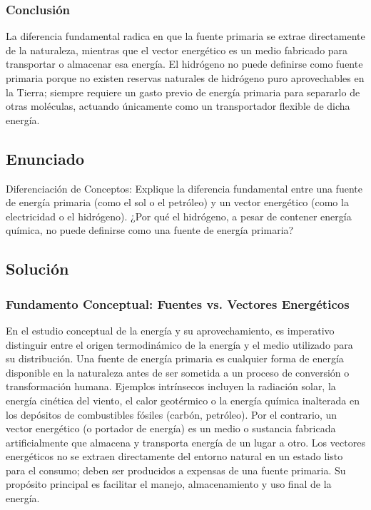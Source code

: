 \documentclass[12pt,a4paper]{article}
\begin{document}
\subsubsection*{Conclusión}
La diferencia fundamental radica en que la fuente primaria se extrae directamente de la naturaleza, mientras que el vector energético es un medio fabricado para transportar o almacenar esa energía. El hidrógeno no puede definirse como fuente primaria porque no existen reservas naturales de hidrógeno puro aprovechables en la Tierra; siempre requiere un gasto previo de energía primaria para separarlo de otras moléculas, actuando únicamente como un transportador flexible de dicha energía.

\newpage

\subsection*{Enunciado}
Diferenciación de Conceptos: Explique la diferencia fundamental entre una fuente de energía primaria (como el sol o el petróleo) y un vector energético (como la electricidad o el hidrógeno). ¿Por qué el hidrógeno, a pesar de contener energía química, no puede definirse como una fuente de energía primaria?

\subsection*{Solución}

\subsubsection*{Fundamento Conceptual: Fuentes vs. Vectores Energéticos}
En el estudio conceptual de la energía y su aprovechamiento, es imperativo distinguir entre el origen termodinámico de la energía y el medio utilizado para su distribución. Una fuente de energía primaria es cualquier forma de energía disponible en la naturaleza antes de ser sometida a un proceso de conversión o transformación humana. Ejemplos intrínsecos incluyen la radiación solar, la energía cinética del viento, el calor geotérmico o la energía química inalterada en los depósitos de combustibles fósiles (carbón, petróleo). 
Por el contrario, un vector energético (o portador de energía) es un medio o sustancia fabricada artificialmente que almacena y transporta energía de un lugar a otro. Los vectores energéticos no se extraen directamente del entorno natural en un estado listo para el consumo; deben ser producidos a expensas de una fuente primaria. Su propósito principal es facilitar el manejo, almacenamiento y uso final de la energía.
\end{document}

